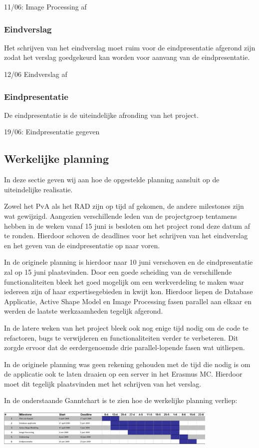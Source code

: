 11/06: Image Processing af

\subsubsection{Eindverslag}

Het schrijven van het eindverslag moet ruim voor de eindpresentatie afgerond
zijn zodat het verslag goedgekeurd kan worden voor aanvang van de eindpresentatie.

12/06 Eindverslag af

\subsubsection{Eindpresentatie}

De eindpresentatie is de uiteindelijke afronding van het project.

19/06: Eindpresentatie gegeven

\subsection{Werkelijke planning}
\label{werkelijke_planning}

In deze sectie geven wij aan hoe de opgestelde planning aansluit op de
uiteindelijke realisatie.

Zowel het PvA als het RAD zijn op tijd af gekomen, de andere milestones zijn
wat gewijzigd. Aangezien verschillende leden van de projectgroep tentamens
hebben in de weken vanaf 15 juni is besloten om het project rond deze datum af
te ronden. Hierdoor schoven de deadlines voor het schrijven van het eindverslag
en het geven van de eindpresentatie op naar voren.

In de originele planning is hierdoor naar 10 juni verschoven en de
eindpresentatie zal op 15 juni plaatsvinden.  Door een goede scheiding van de
verschillende functionaliteiten bleek het goed mogelijk om een werkverdeling te
maken waar iedereen zijn of haar expertisegebieden in kwijt kon. Hierdoor
liepen de Database Applicatie, Active Shape Model en Image Processing fasen
parallel aan elkaar en werden de laatste werkzaamheden tegelijk afgerond.

In de latere weken van het project bleek ook nog enige tijd nodig om de code te
refactoren, bugs te verwijderen en functionaliteiten verder te verbeteren. Dit
zorgde ervoor dat de eerdergenoemde drie parallel-lopende fasen wat uitliepen.

In de originele planning was geen rekening gehouden met de tijd die nodig is om
de applicatie ook te laten draaien op een server in het Erasmus MC. Hierdoor
moet dit tegelijk plaatsvinden met het schrijven van het verslag.

In de onderstaande Ganntchart is te zien hoe de werkelijke planning verliep:

\includegraphics[width=0.8\textwidth]{ganntafter}
